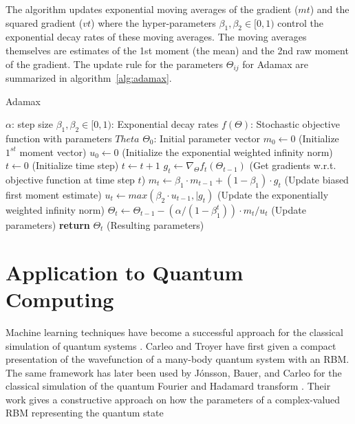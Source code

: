 The algorithm updates exponential moving averages of the gradient ($mt$) and the squared gradient
($vt$) where the hyper-parameters $\beta_1, \beta_2 \in [0, 1)$ control the exponential decay rates of these moving
averages. The moving averages themselves are estimates of the 1st moment (the mean) and the
2nd raw moment of the gradient. The update rule for the parameters $\Theta_{ij}$ for Adamax are summarized in 
algorithm~\ref{alg:adamax}.

\begin{algorithm}
    \label{alg:adamax}
    \caption{Adamax}\label{euclid}
    \begin{algorithmic}[1]
        \Require $\alpha$: step size
        \Require $\beta_1, \beta_2 \in [0,1)$: Exponential decay rates
        \Require $f(\Theta)$: Stochastic objective function with parameters $Theta$
        \Require $\Theta_0$: Initial parameter vector
        \State $m_0 \gets 0$ (Initialize $1^{st}$ moment vector)
        \State $u_0 \gets 0$ (Initialize the exponential weighted infinity norm)
        \State $t \gets 0$ (Initialize time step)
            \State $t\gets t+1$
            \State $g_t \gets \nabla_{\Theta}f_t(\Theta_{t-1})$ (Get gradients w.r.t. objective function at time step $t$)
            \State $m_t \gets \beta_1 \cdot m_{t-1} + (1-\beta_1) \cdot g_t$ (Update biased first moment estimate)
            \State $u_t \gets max(\beta_2 \cdot u_{t-1}, \vert{g_t})$ (Update the exponentially weighted infinity norm)
            \State $\Theta_t \gets \Theta_{t-1} - (\alpha/ (1-\beta_1^t)) \cdot m_t/u_t$ (Update parameters)
        \EndWhile
        \State \textbf{return} $\Theta_t$ (Resulting parameters)
    \end{algorithmic}
\end{algorithm}

\section{Application to Quantum Computing}
\label{sec:applicationToQuantumComputing}
Machine learning techniques have become a successful approach for the classical simulation
of quantum systems \cite{carleo2017solving, deng2017quantum, carleo2018constructing}. 
Carleo and Troyer \cite{carleo2017solving} have first given a compact presentation of the wavefunction of a many-body quantum system with an RBM.
The same framework has later been used by J\'{o}nsson, Bauer, and Carleo for the classical simulation of the quantum Fourier and Hadamard transform \cite{jnsson2018neuralnetwork}. Their work gives a constructive approach on how the parameters of a complex-valued RBM representing the quantum state

